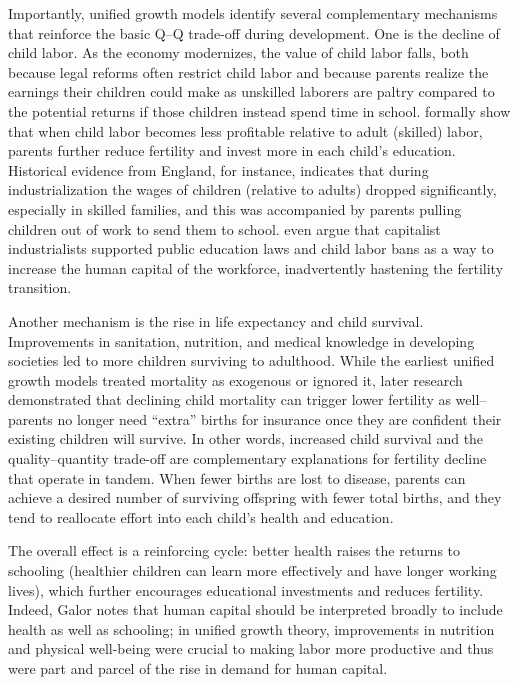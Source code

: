 \documentclass[]{AEA}
\begin{document}
Importantly, unified growth models identify several complementary
mechanisms that reinforce the basic Q--Q trade-off during development.
One is the decline of child labor. As the economy modernizes, the value
of child labor falls, both because legal reforms often restrict child
labor and because parents realize the earnings their children could make
as unskilled laborers are paltry compared to the potential returns if
those children instead spend time in school. \citet{hazan2002child}
formally show that when child labor becomes less profitable relative to
adult (skilled) labor, parents further reduce fertility and invest more
in each child's education. Historical evidence from England, for
instance, indicates that during industrialization the wages of children
(relative to adults) dropped significantly, especially in skilled
families, and this was accompanied by parents pulling children out of
work to send them to school. \citet{galor2006human} even argue that
capitalist industrialists supported public education laws and child
labor bans as a way to increase the human capital of the workforce,
inadvertently hastening the fertility transition.

Another mechanism is the rise in life expectancy and child survival.
Improvements in sanitation, nutrition, and medical knowledge in
developing societies led to more children surviving to adulthood. While
the earliest unified growth models treated mortality as exogenous or
ignored it, later research demonstrated that declining child mortality
can trigger lower fertility as well-- parents no longer need ``extra''
births for insurance once they are confident their existing children
will survive. In other words, increased child survival and the
quality--quantity trade-off are complementary explanations for fertility
decline that operate in tandem. When fewer births are lost to disease,
parents can achieve a desired number of surviving offspring with fewer
total births, and they tend to reallocate effort into each child's
health and education.

The overall effect is a reinforcing cycle: better health raises the
returns to schooling (healthier children can learn more effectively and
have longer working lives), which further encourages educational
investments and reduces fertility. Indeed, Galor notes that human
capital should be interpreted broadly to include health as well as
schooling; in unified growth theory, improvements in nutrition and
physical well-being were crucial to making labor more productive and
thus were part and parcel of the rise in demand for human capital.
\end{document}
